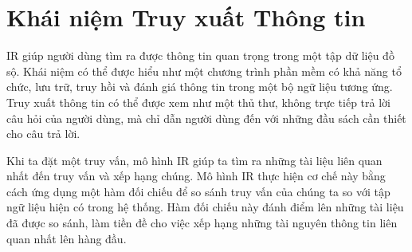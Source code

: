 \section{Khái niệm Truy xuất Thông tin}
IR giúp người dùng tìm ra được thông tin quan trọng trong một tập dữ liệu đồ sộ. Khái niệm có thể được hiểu như một chương trình phần mềm có khả năng tổ chức, lưu trữ, truy hồi và đánh giá thông tin trong một bộ ngữ liệu tương ứng. Truy xuất thông tin có thể được xem như một thủ thư, không trực tiếp trả lời câu hỏi của người dùng, mà chỉ dẫn người dùng đến với những đầu sách cần thiết cho câu trả lời. \cite{geeksforgeeks}

Khi ta đặt một truy vấn, mô hình IR giúp ta tìm ra những tài liệu liên quan nhất đến truy vấn và xếp hạng chúng. Mô hình IR thực hiện cơ chế này bằng cách ứng dụng một hàm đối chiếu để so sánh truy vấn của chúng ta so với tập ngữ liệu hiện có trong hệ thống. Hàm đối chiếu này đánh điểm lên những tài liệu đã được so sánh, làm tiền đề cho việc xếp hạng những tài nguyên thông tin liên quan nhất lên hàng đầu. \cite{geeksforgeeks}
